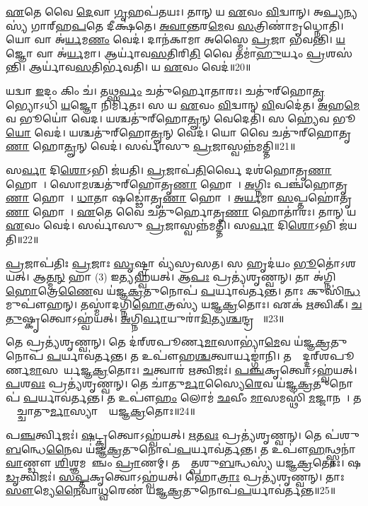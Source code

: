 \ul{𑌏}𑌤𑍇 𑌵𑍈 \ul{𑌦𑍇}𑌵𑌾 \ul{𑌗𑍃}𑌹𑌪॑𑌤𑌯𑌃।
𑌤𑌾𑌨𑍍 𑌯 \ul{𑌏}𑌵𑌂 \ul{𑌵𑌿}𑌦𑍍𑌵𑌾𑌨𑍍।
𑌅\ul{𑌪𑍍𑌯}𑌨𑍍𑌯𑌸𑍍𑌯॑ 𑌗𑌾𑌰𑍍‌\mbox{}𑌹\ul{𑌪}𑌤𑍇 𑌦𑍀𑌕𑍍𑌷॑𑌤𑍇।
\ul{𑌅}\ul{𑌵𑌾}\ul{𑌨𑍍𑌤}𑌰\ul{𑌮𑍇}𑌵 \ul{𑌸}𑌤𑍍𑌰𑌿𑌣𑌾॑𑌮𑍃𑌧𑍍𑌨𑍋𑌤𑌿।
𑌯𑍋 𑌵𑌾 𑌅॑\ul{𑌰𑍍𑌯}𑌮\ul{𑌣𑌂} 𑌵𑍇𑌦॑।
𑌦𑌾𑌨॑𑌕𑌾𑌮𑌾 𑌅𑌸𑍍𑌮𑍈 \ul{𑌪𑍍𑌰}𑌜𑌾 𑌭॑𑌵𑌨𑍍𑌤𑌿।
\ul{𑌯}𑌜𑍍𑌞𑍋 𑌵𑌾 𑌅॑\ul{𑌰𑍍𑌯}𑌮𑌾।
𑌆𑌰𑍍𑌯𑌾॑𑌵\ul{𑌸}𑌤𑌿𑌰𑌿\ul{𑌤𑌿} 𑌵𑍈 𑌤𑌮𑌾॑\ul{𑌹𑍁}𑌰𑍍𑌯𑌂 \ul{𑌪𑍍𑌰}𑌶𑌸॑𑌨𑍍𑌤𑌿।
𑌆𑌰𑍍𑌯𑌾॑𑌵\ul{𑌸}𑌤𑌿𑌰𑍍𑌭॑𑌵𑌤𑌿।
𑌯 \ul{𑌏}𑌵𑌂 𑌵𑍇𑌦॑॥20॥

𑌯𑌦𑍍𑌵𑌾 \ul{𑌇}𑌦𑌂 𑌕𑌿𑌂 𑌚॑।
𑌤𑌥𑍍𑌸\ul{𑌰𑍍𑌵𑌂} 𑌚𑌤𑍁॑𑌰𑍍\mbox{}𑌹𑍋𑌤𑌾𑌰𑌃।
𑌚𑌤𑍁॑𑌰𑍍‌\mbox{}𑌹𑍋\ul{𑌤𑍃}𑌭𑍍𑌯𑍋𑌽𑌧𑌿॑ \ul{𑌯}𑌜𑍍𑌞𑍋 𑌨𑌿𑌰𑍍𑌮𑌿॑𑌤𑌃।
𑌸 𑌯 \ul{𑌏}𑌵𑌂 \ul{𑌵𑌿}𑌦𑍍𑌵𑌾𑌨𑍍‌ \ul{𑌵𑌿}𑌵𑌦𑍇॑𑌤।
\ul{𑌅}𑌹\ul{𑌮𑍇}𑌵 𑌭𑍂𑌯𑍋॑ 𑌵𑍇𑌦।
𑌯𑌶𑍍𑌚𑌤𑍁॑𑌰𑍍‌\mbox{}𑌹𑍋\ul{𑌤𑍄}𑌨𑍍 𑌵𑍇𑌦𑍇𑌤𑌿॑।
𑌸 𑌹𑍍𑌯𑍇॑𑌵 𑌭𑍂\ul{𑌯𑍋} 𑌵𑍇𑌦॑।
𑌯𑌶𑍍𑌚𑌤𑍁॑𑌰𑍍‌\mbox{}𑌹𑍋\ul{𑌤𑍄}𑌨𑍍 𑌵𑍇𑌦॑।
𑌯𑍋 𑌵𑍈 𑌚𑌤𑍁॑𑌰𑍍‌\mbox{}𑌹𑍋𑌤𑍃\ul{𑌣𑌾}\ul{} 𑌹𑍋\ul{𑌤𑍄}𑌨𑍍 𑌵𑍇𑌦॑।
𑌸𑌰𑍍𑌵𑌾॑𑌸𑍁 \ul{𑌪𑍍𑌰}𑌜𑌾𑌸𑍍𑌵𑌨𑍍𑌨॑𑌮𑌤𑍍𑌤𑌿॥21॥

𑌸\ul{𑌰𑍍𑌵𑌾} 𑌦𑌿\ul{𑌶𑍋}𑌽𑌭𑌿 𑌜॑𑌯𑌤𑌿।
\ul{𑌪𑍍𑌰}𑌜𑌾𑌪॑\ul{𑌤𑌿}𑌰𑍍𑌵𑍈 𑌦𑌶॑𑌹𑍋𑌤𑍃\ul{𑌣𑌾}\ul{} 𑌹𑍋𑌤𑌾᳚।
𑌸𑍋\ul{𑌮}𑌶𑍍𑌚𑌤𑍁॑𑌰𑍍‌\mbox{}𑌹𑍋𑌤𑍃\ul{𑌣𑌾}\ul{} 𑌹𑍋𑌤𑌾᳚।
\ul{𑌅}𑌗𑍍𑌨𑌿𑌃 𑌪𑌞𑍍𑌚॑𑌹𑍋𑌤𑍃\ul{𑌣𑌾}\ul{} 𑌹𑍋𑌤𑌾᳚।
\ul{𑌧𑌾}𑌤𑌾 𑌷𑌡𑍍𑌢𑍋॑𑌤𑍃\ul{𑌣𑌾}\ul{} 𑌹𑍋𑌤𑌾᳚।
\ul{𑌅}\ul{𑌰𑍍𑌯}𑌮𑌾 \ul{𑌸}𑌪𑍍𑌤𑌹𑍋॑𑌤𑍃\ul{𑌣𑌾}\ul{} 𑌹𑍋𑌤𑌾᳚।
\ul{𑌏}𑌤𑍇 𑌵𑍈 𑌚𑌤𑍁॑𑌰𑍍\mbox{}𑌹𑍋𑌤𑍃\ul{𑌣𑌾}\ul{} 𑌹𑍋𑌤𑌾॑𑌰𑌃।
𑌤𑌾𑌨𑍍 𑌯 \ul{𑌏}𑌵𑌂 𑌵𑍇𑌦॑।
𑌸𑌰𑍍𑌵𑌾॑𑌸𑍁 \ul{𑌪𑍍𑌰}𑌜𑌾𑌸𑍍𑌵𑌨𑍍𑌨॑𑌮𑌤𑍍𑌤𑌿।
𑌸\ul{𑌰𑍍𑌵𑌾} 𑌦𑌿\ul{𑌶𑍋}𑌽𑌭𑌿 𑌜॑𑌯𑌤𑌿॥22॥\anuvakamend[\ul{𑌆}\ul{𑌰𑍍𑌧𑍍𑌨𑍁}\ul{𑌵}\ul{𑌨𑍍𑌨𑌾}\ul{𑌰𑍍𑌧𑍍𑌨𑍁}\ul{𑌵}𑌨𑍍𑌨𑌿\ul{𑌤𑍍𑌯𑍇}𑌵𑌂 𑌵𑍇𑌦𑌾᳚𑌤𑍍𑌤𑌿 𑌸\ul{𑌰𑍍𑌵𑌾} 𑌦𑌿\ul{𑌶𑍋}𑌽𑌭𑌿 𑌜॑𑌯𑌤𑌿 (𑌵𑍈 𑌤𑍇𑌨॑ \ul{𑌸}𑌤𑍍𑌰𑌙𑍍𑌕𑍇𑌨॑॥)]

\ul{𑌪𑍍𑌰}𑌜𑌾𑌪॑𑌤𑌿𑌃 \ul{𑌪𑍍𑌰}𑌜𑌾𑌃 \ul{𑌸𑍃}𑌷𑍍𑌟𑍍𑌵𑌾 𑌵𑍍𑌯॑𑌸𑍍𑌰𑌸𑌤।
𑌸 𑌹𑍃𑌦॑𑌯𑌂 \ul{𑌭𑍂}𑌤𑍋॑\-𑌽𑌶𑌯𑌤𑍍।
𑌆\ul{𑌤𑍍𑌮}\ul{𑌨𑍍} 𑌹𑌾 (3) 𑌇𑌤𑍍𑌯𑌹𑍍𑌵॑𑌯𑌤𑍍।
𑌆\ul{𑌪𑌃} 𑌪𑍍𑌰𑌤𑍍𑌯॑𑌶𑍃𑌣𑍍𑌵𑌨𑍍।
𑌤𑌾 𑌅॑𑌗𑍍𑌨𑌿\ul{𑌹𑍋}𑌤𑍍𑌰𑍇\ul{𑌣𑍈}𑌵 𑌯॑𑌜𑍍𑌞\ul{𑌕𑍍𑌰}𑌤𑍁𑌨𑍋𑌪॑ \ul{𑌪}𑌰𑍍𑌯𑌾𑌵॑𑌰𑍍𑌤𑌨𑍍𑌤।
𑌤𑌾𑌃 𑌕𑍁𑌸𑌿॑\ul{𑌨𑍍𑌧}𑌮𑍁𑌪𑍗॑𑌹𑌨𑍍।
𑌤𑌸𑍍𑌮𑌾॑𑌦𑌗𑍍𑌨𑌿\ul{𑌹𑍋}𑌤𑍍𑌰𑌸𑍍𑌯॑ 𑌯𑌜𑍍𑌞\ul{𑌕𑍍𑌰}𑌤𑍋𑌃।
𑌏𑌕॑ \ul{𑌋}𑌤𑍍𑌵𑌿𑌕𑍍।
\ul{𑌚}\ul{𑌤𑍁}𑌷𑍍𑌕𑍃𑌤𑍍𑌵𑍋\-𑌽𑌹𑍍𑌵॑𑌯𑌤𑍍।
\ul{𑌅}𑌗𑍍𑌨𑌿\ul{𑌰𑍍𑌵𑌾}𑌯𑍁𑌰𑌾॑\ul{𑌦𑌿}𑌤𑍍𑌯\ul{𑌶𑍍𑌚}𑌨𑍍𑌦𑍍𑌰𑌮𑌾𑌃᳚॥23॥

𑌤𑍇 𑌪𑍍𑌰𑌤𑍍𑌯॑𑌶𑍃𑌣𑍍𑌵𑌨𑍍।
𑌤𑍇 𑌦॑𑌰𑍍‌\mbox{}𑌶𑌪𑍂𑌰𑍍𑌣\ul{𑌮𑌾}𑌸𑌾𑌭𑍍𑌯𑌾॑\ul{𑌮𑍇}𑌵 𑌯॑𑌜𑍍𑌞\ul{𑌕𑍍𑌰}𑌤𑍁𑌨𑍋𑌪॑ \ul{𑌪}𑌰𑍍𑌯𑌾𑌵॑𑌰𑍍𑌤𑌨𑍍𑌤।
𑌤 𑌉𑌪𑍗॑𑌹\ul{𑌶𑍍𑌚}𑌤𑍍𑌵𑌾𑌰𑍍𑌯𑌙𑍍𑌗𑌾॑𑌨𑌿।
𑌤𑌸𑍍𑌮𑌾᳚𑌦𑍍𑌦𑌰𑍍‌\mbox{}𑌶𑌪𑍂𑌰𑍍𑌣\-\ul{𑌮𑌾}𑌸𑌯𑍋᳚𑌰𑍍𑌯𑌜𑍍𑌞\ul{𑌕𑍍𑌰}𑌤𑍋𑌃।
\ul{𑌚}𑌤𑍍𑌵𑌾𑌰॑ \ul{𑌋}𑌤𑍍𑌵𑌿𑌜𑌃॑।
\ul{𑌪}\ul{𑌞𑍍𑌚}𑌕𑍃𑌤𑍍𑌵𑍋\-𑌽𑌹𑍍𑌵॑𑌯𑌤𑍍।
\ul{𑌪}𑌶\ul{𑌵𑌃} 𑌪𑍍𑌰𑌤𑍍𑌯॑𑌶𑍃𑌣𑍍𑌵𑌨𑍍।
𑌤𑍇 𑌚𑌾॑𑌤𑍁\ul{𑌰𑍍𑌮𑌾}𑌸𑍍𑌯𑍈\ul{𑌰𑍇}𑌵 𑌯॑𑌜𑍍𑌞\ul{𑌕𑍍𑌰}𑌤𑍁𑌨𑍋𑌪॑ \ul{𑌪}𑌰𑍍𑌯𑌾𑌵॑𑌰𑍍𑌤𑌨𑍍𑌤।
𑌤 𑌉𑌪𑍗॑\ul{𑌹𑌂} 𑌲𑍋𑌮॑ \ul{𑌛}𑌵𑍀𑌂 \ul{𑌮𑌾}\ul{}𑌸𑌮𑌸𑍍𑌥𑌿॑ \ul{𑌮}𑌜𑍍𑌜𑌾𑌨𑌮𑍍᳚।
𑌤𑌸𑍍𑌮𑌾᳚𑌚𑍍𑌚𑌾𑌤𑍁\ul{𑌰𑍍𑌮𑌾}𑌸𑍍𑌯𑌾𑌨𑌾𑌂᳚ 𑌯𑌜𑍍𑌞\ul{𑌕𑍍𑌰}𑌤𑍋𑌃॥24॥

𑌪\ul{𑌞𑍍𑌚}𑌰𑍍𑌤𑍍𑌵𑌿𑌜𑌃॑।
\ul{𑌷}𑌟𑍍𑌕𑍃𑌤𑍍𑌵𑍋\-𑌽𑌹𑍍𑌵॑𑌯𑌤𑍍।
\ul{𑌋}𑌤\ul{𑌵𑌃} 𑌪𑍍𑌰𑌤𑍍𑌯॑𑌶𑍃𑌣𑍍𑌵𑌨𑍍।
𑌤𑍇 𑌪॑𑌶𑍁\ul{𑌬}𑌨𑍍𑌧𑍇\ul{𑌨𑍈}𑌵 𑌯॑𑌜𑍍𑌞\ul{𑌕𑍍𑌰}𑌤𑍁𑌨𑍋𑌪॑\ul{𑌪}𑌰𑍍𑌯𑌾𑌵॑𑌰𑍍𑌤𑌨𑍍𑌤।
𑌤 𑌉𑌪𑍗॑\ul{𑌹}𑌨𑍍𑌥𑍍𑌸𑍍𑌤𑌨𑌾॑\ul{𑌵𑌾}𑌣𑍍𑌡𑍗 \ul{𑌶𑌿}𑌶𑍍𑌞𑌮𑌵𑌾᳚𑌞𑍍𑌚𑌂 \ul{𑌪𑍍𑌰𑌾}𑌣𑌮𑍍।
𑌤𑌸𑍍𑌮𑌾᳚𑌤𑍍𑌪𑌶𑍁\ul{𑌬}𑌨𑍍𑌧𑌸𑍍𑌯॑ 𑌯𑌜𑍍𑌞\ul{𑌕𑍍𑌰}𑌤𑍋𑌃।
𑌷\ul{𑌡𑍃}𑌤𑍍𑌵𑌿𑌜𑌃॑।
\ul{𑌸}\ul{𑌪𑍍𑌤}𑌕𑍃𑌤𑍍𑌵𑍋\-𑌽𑌹𑍍𑌵॑𑌯𑌤𑍍।
𑌹𑍋\ul{𑌤𑍍𑌰𑌾𑌃} 𑌪𑍍𑌰𑌤𑍍𑌯॑𑌶𑍃𑌣𑍍𑌵𑌨𑍍।
𑌤𑌾𑌃 \ul{𑌸𑍗}𑌮𑍍𑌯𑍇\ul{𑌨𑍈}𑌵𑌾\ul{𑌧𑍍𑌵}𑌰𑍇𑌣॑ 𑌯𑌜𑍍𑌞\ul{𑌕𑍍𑌰}𑌤𑍁𑌨𑍋𑌪॑\ul{𑌪}𑌰𑍍𑌯𑌾𑌵॑𑌰𑍍𑌤𑌨𑍍𑌤॥25॥

